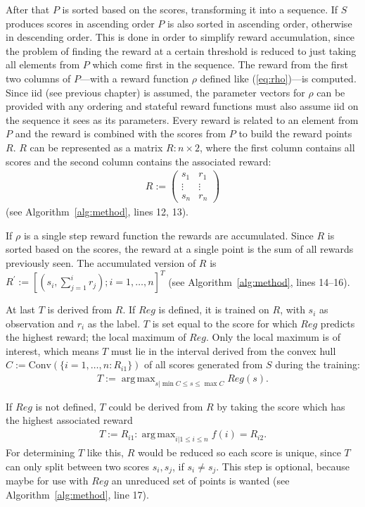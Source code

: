 \documentclass[twoside,11pt]{article}
\DeclareMathOperator*{\argmax}{arg\,max}
\begin{document}
After that $P$ is sorted based on the scores, transforming
it into a sequence.
If $S$ produces scores in ascending order $P$ is also
sorted in ascending order, otherwise in descending order.
This is done in order to simplify reward accumulation,
since the problem of finding the reward at a certain
threshold is reduced to just taking all elements from $P$
which come first in the sequence.
The reward from the first two columns of $P$---with a
reward function $\rho$ defined like (\ref{eq:rho})---is
computed.
Since iid (see previous chapter) is assumed, the parameter
vectors for $\rho$ can be provided with any ordering and
stateful reward functions must also assume iid on the
sequence it sees as its parameters.
Every reward is related to an element from $P$ and the
reward is combined with the scores from $P$ to build the
reward points $R$. $R$ can be represented as a matrix
$R: n \times 2$, where the first column contains all scores
and the second column contains the associated reward:
\begin{align*}
  R :=
    \begin{pmatrix}
      s_1 &r_1 \\
      \vdots &\vdots \\
      s_n &r_n
    \end{pmatrix}
\end{align*}
(see Algorithm~\ref{alg:method}, lines 12, 13).

If $\rho$ is a single step reward function the rewards
are accumulated.
Since $R$ is sorted based on the scores, the reward at a
single point is the sum of all rewards previously seen.
The accumulated version of $R$ is
$R^\prime := [(s_i, \sum_{j=1}^{i} r_j); i=1,\dots,n]^T$
(see Algorithm~\ref{alg:method}, lines 14--16).

At last $T$ is derived from $R$. If $Reg$ is defined, it
is trained on $R$, with $s_i$ as observation and $r_i$ as
the label. $T$ is set equal to the score for which $Reg$
predicts the highest reward; the local maximum of $Reg$.
Only the local maximum is of interest, which means $T$
must lie in the interval derived from the convex hull
$C := \text{Conv}(\{i=1,\dots,n:R_{i1}\})$ of
all scores generated from $S$ during the training:
\begin{align}
  \label{eq:T_Reg}
  T := \argmax_{s | \min C \leq s \leq \max C} Reg(s).
\end{align}

If $Reg$ is not defined, $T$ could be derived from $R$
by taking the score which has the highest associated
reward
\begin{align}
  \label{eq:T_R}
  T := R_{i1}: \argmax_{i|1 \leq i \leq n} f(i) = R_{i2}.
\end{align}
For determining $T$ like this, $R$ would be reduced so each
score is unique, since $T$ can only split between two
scores $s_i, s_j$, if $s_i \neq s_j$.
This step is optional, because maybe for use with $Reg$ an
unreduced set of points is wanted
(see Algorithm~\ref{alg:method}, line 17).
\end{document}
